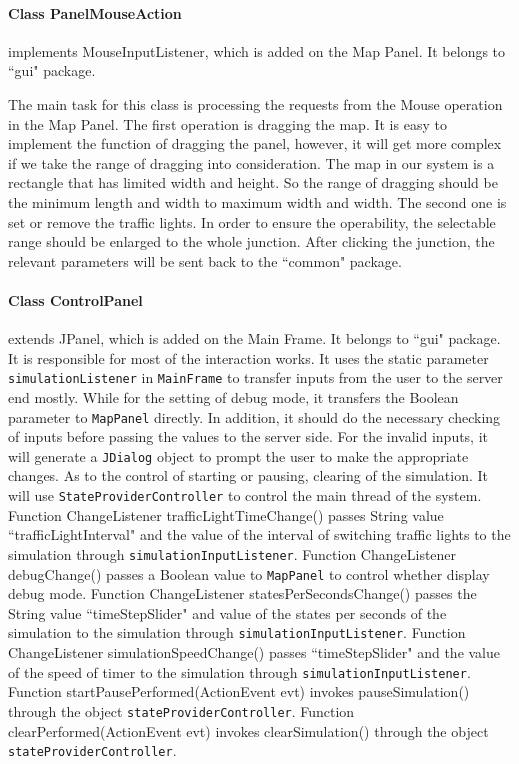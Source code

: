 \documentclass[a4paper,12pt]{article}
\begin{document}
\paragraph{Class PanelMouseAction} implements MouseInputListener, which is added on the Map Panel. It belongs to ``gui" package. 

The main task for this class is processing the requests from the Mouse operation in the Map Panel. The first operation is dragging the map. It is easy to implement the function of dragging the panel, however, it will get more complex if we take the range of dragging into consideration. The map in our system is a rectangle that has limited width and height. So the range of dragging should be the minimum length and width to maximum width and width. The second one is set or remove the traffic lights. In order to ensure the operability, the selectable range should be enlarged to the whole junction. After clicking the junction, the relevant parameters will be sent back to the ``common" package.
\paragraph{Class ControlPanel} extends JPanel, which is added on the Main Frame. It belongs to ``gui" package. It is responsible for most of the interaction works. It uses the static parameter \verb|simulationListener| in \verb|MainFrame| to transfer inputs from the user to the server end mostly. While for the setting of debug mode, it transfers the Boolean parameter to \verb|MapPanel| directly. In addition, it should do the necessary checking of inputs before passing the values to the server side. For the invalid inputs, it will generate a \verb|JDialog| object to prompt the user to make the appropriate changes. As to the control of starting or pausing, clearing of the simulation. It will use \verb|StateProviderController| to control the main thread of the system. Function ChangeListener trafficLightTimeChange() passes String value ``trafficLightInterval" and the value of the interval of switching traffic lights to the simulation through \verb|simulationInputListener|. Function ChangeListener debugChange() passes a Boolean value to \verb|MapPanel| to control whether display debug mode. Function ChangeListener statesPerSecondsChange() passes the String value ``timeStepSlider" and value of the states per seconds of the simulation to the simulation through \verb|simulationInputListener|. Function ChangeListener simulationSpeedChange() passes ``timeStepSlider" and the value of the speed of timer to the simulation through \verb|simulationInputListener|. Function startPausePerformed(ActionEvent evt) invokes pauseSimulation() through the object \verb|stateProviderController|. Function clearPerformed(ActionEvent evt) invokes clearSimulation() through the object \verb|stateProviderController|. 
\end{document}
